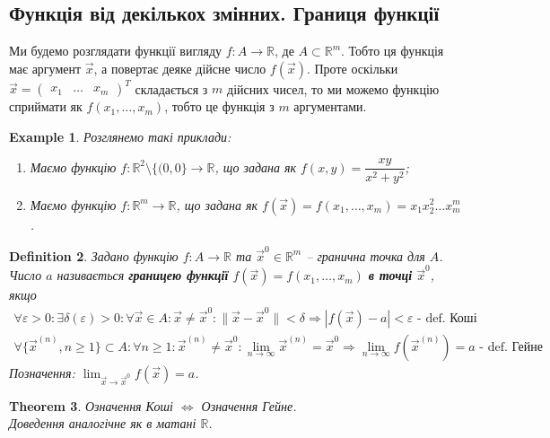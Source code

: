 \documentclass[a4paper, 10pt]{article}
\def\huge{\displaystyle}
\theoremstyle{theoremdd}
\newtheorem{theorem}{Theorem}[subsection]
\theoremstyle{theoremdd}
\theoremstyle{theoremdd}
\newtheorem{definition}[theorem]{Definition}
\theoremstyle{theoremdd}
\theoremstyle{theoremdd}
\newtheorem{example}[theorem]{Example}
\theoremstyle{theoremdd}
\theoremstyle{theoremdd}
\theoremstyle{theoremdd}
\theoremstyle{theoremdd}
\newcommand\Norm[1]{\|#1\|}
\begin{document}
\subsection{Функція від декількох змінних. Границя функції}
Ми будемо розглядати функції вигляду $f \colon A \to \mathbb{R}$, де $A \subset \mathbb{R}^m$. Тобто ця функція має аргумент $\vec{x}$, а повертає деяке дійсне число $f(\vec{x})$. Проте оскільки $\vec{x} = \begin{pmatrix}
x_1 & \dots & x_m
\end{pmatrix}^T$ складається з $m$ дійсних чисел, то ми можемо функцію сприймати як $f(x_1,\dots,x_m)$, тобто це функція з $m$ аргументами.

\begin{example} Розглянемо такі приклади:
\begin{enumerate}[nosep,wide=0pt,label={\arabic*)}]
\item Маємо функцію $f \colon \mathbb{R}^2 \setminus \{(0,0\} \to \mathbb{R}$, що задана як $f(x,y) = \dfrac{xy}{x^2+y^2}$;
\item Маємо функцію $f \colon \mathbb{R}^m \to \mathbb{R}$, що задана як $f(\vec{x}) = f(x_1,\dots,x_m) = x_1 x_2^2 \dots x_m^m$.
\end{enumerate}
\end{example}

\begin{definition}
Задано функцію $f \colon A \to \mathbb{R}$ та $\vec{x}^0 \in \mathbb{R}^m$ -- гранична точка для $A$.\\
Число $a$ називається \textbf{границею функції} $f(\vec{x}) = f(x_1,\dots,x_m)$ \textbf{в точці} $\vec{x}^0$, якщо
\begin{align*}
\forall \varepsilon > 0: \exists \delta(\varepsilon) > 0: \forall \vec{x} \in A: \vec{x} \neq \vec{x}^0: \Norm{\vec{x} - \vec{x}^0} < \delta \Rightarrow |f(\vec{x}) - a| < \varepsilon \textrm{ - def. Коші}\\
\forall \{\vec{x}^{(n)}, n \geq 1\} \subset A: \forall n \geq 1: \vec{x}^{(n)} \neq \vec{x}^0: \huge \lim_{n \to \infty} \vec{x}^{(n)} = \vec{x}^0 \Rightarrow \lim_{n \to \infty} f(\vec{x}^{(n)}) = a \textrm{ - def. Гейне}
\end{align*}
Позначення: $\huge \lim_{\vec{x} \to \vec{x}^0} f(\vec{x}) = a$.
\end{definition}

\begin{theorem}
Означення Коші $\iff$ Означення Гейне.\\
\textit{Доведення аналогічне як в матані $\mathbb{R}$.}
\end{theorem}
\end{document}

